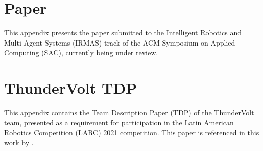 \appendix

\chapter{Paper}
\label{appendix:paper}

This appendix presents the paper submitted to the Intelligent Robotics and Multi-Agent Systems (IRMAS) track of the ACM Symposium on Applied Computing (SAC), currently being under review.



\chapter{ThunderVolt TDP}
\label{appendix:tdp}

This appendix contains the Team Description Paper (TDP) of the ThunderVolt team, presented as a requirement for participation in the Latin American Robotics Competition (LARC) 2021 competition. This paper is referenced in this work by \cite{TDPThunderVolt}.


